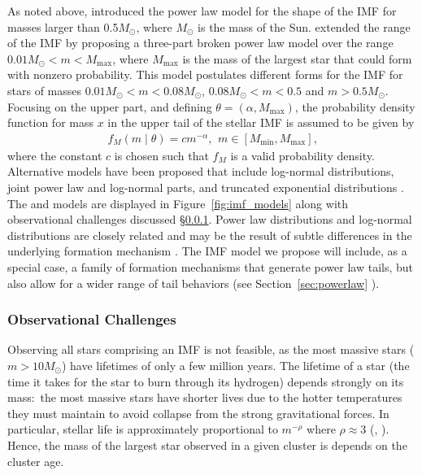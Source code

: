 \documentclass[12pt]{article}
\newcommand{\Msun}{M_{\odot}}
\newcommand{\Mmax}{M_{\text{max}}}
\newcommand{\Mmin}{M_{\text{min}}}
\begin{document}
As noted above, \cite{salpeter55} introduced the power law model for the shape of the IMF for masses larger
than 0.5$\Msun$, where $\Msun$ is the mass of the Sun.
\cite{kroupa2001} extended the range of the IMF by proposing a three-part broken power law model 
over the range $0.01 \Msun < m < \Mmax$, where $\Mmax$ is the mass of the largest star that could form with nonzero probability.
This model postulates different forms for the IMF for stars of masses $0.01 \Msun < m < 0.08 \Msun$,
$0.08 \Msun < m < 0.5$ and $m > 0.5\Msun$.
Focusing on the upper part, and defining $\theta = (\alpha, \Mmax)$, the probability density function for mass $x$ in the upper tail of the stellar IMF is assumed to be given by
\begin{align}
	f_M(m \mid \theta) = cm^{-\alpha}\text{,}\;\; m \in [\Mmin, \Mmax]\text{,}
	\label{eq:imf}
\end{align}
where the constant $c$ is chosen such that $f_M$ is a valid probability density.  Alternative models have been proposed that include log-normal distributions, joint power law and log-normal parts, and truncated exponential distributions  \citep{Chabrier:2003om, Chabrier:2003oq, chabrier2005,IMF50,bastian2010, OffnerEtAl2014}.  The \cite{kroupa2001} and \cite{Chabrier:2003om, Chabrier:2003oq} models are displayed in Figure~\ref{fig:imf_models} along with observational challenges discussed \S\ref{sec:observational}.
Power law distributions and log-normal distributions are closely related and may be the result of subtle differences in the underlying formation mechanism \citep{Mitzenmacher2004}.  
The IMF model we propose will include, as a special case, a family of formation mechanisms that generate
power law tails, but also allow for a wider range of tail behaviors (see Section~\ref{sec:powerlaw} ).


\subsubsection{Observational Challenges} \label{sec:observational}
Observing all stars comprising an IMF 
is not feasible, as the most massive stars ($m > 10 \Msun$) have lifetimes of 
only a few million years.
The lifetime of a star (the time it takes for the star to burn through its
hydrogen) depends strongly on its mass:~the most massive
stars have shorter lives due to the hotter temperatures they must maintain
to avoid collapse from the strong gravitational forces. In particular,
stellar life is 
approximately proportional to $m^{-\rho}$ 
where $\rho \approx 3$ (\citealt[p. 30]{hansen2004}, \citealt[p. 439]{Chaisson:2011}). 
Hence, the mass of the largest star observed in a given 
cluster is depends on the cluster age.  %
\end{document}

